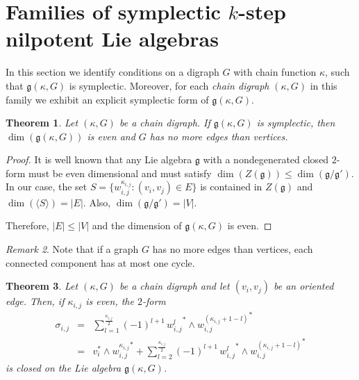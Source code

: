\documentclass[a4paper,11pt]{amsart}
\newtheorem{theorem}{Theorem}[section]
\theoremstyle{definition}
\theoremstyle{remark}
\newtheorem{remark}[theorem]{Remark}
\numberwithin{equation}{section}
\newcommand{\g}{\mathfrak{g}}
\begin{document}
\section{Families of symplectic $k$-step nilpotent Lie algebras }\label{sec:fam-sym}

In this section we identify conditions on a digraph $G$ with chain function $\kappa$, such that $\g(\kappa,G)$ is symplectic. 
Moreover, for each \emph{chain digraph} $(\kappa,G)$ in this family we exhibit an explicit symplectic form of $\g(\kappa,G)$.


\begin{theorem}
Let \((\kappa,G)\) be a chain digraph. If \(\g(\kappa,G)\) is symplectic, then \(\dim(\g(\kappa,G))\) is even and \(G\) has no more edges than vertices.
\end{theorem}

\begin{proof}
It is well known that any Lie algebra \(\g\) with a nondegenerated closed \(2\)-form must be even dimensional and must satisfy \(\dim(Z(\g))\leq \dim(\g/ \g')\). 
In our case, the set \(S=\{w_{i,j}^{\kappa_{i,j}}: (v_i,v_j)\in E\}\) is contained in \(Z(\g)\) and \(\dim(\langle S\rangle)=|E|\). Also, \(\dim(\g/ \g')=|V|\).

Therefore, \(|E|\leq |V|\) and the dimension of \(\g(\kappa,G)\) is even.
\end{proof}

\begin{remark}\label{rmk:graphs}
Note that if a graph $G$ has no more edges than vertices, each connected component has at most one cycle. 
\end{remark}


\begin{theorem}\label{thm:even}
	Let \((\kappa,G)\) be a chain digraph and let $(v_i,v_j)$ be an oriented edge.
    Then, if $\kappa_{i,j}$ is even, the \(2\)-form 
    \begin{eqnarray}
    	 \sigma_{i,j} &=& \sum_{l=1}^{\frac{\kappa_{i,j}}2} (-1)^{l+1} \,{w_{i,j}^{l}}^* \wedge {w_{i,j}^{(\kappa_{i,j}+1-l)}}^* 
                                                                                                                   \label{eqn:sigma-even}\\ 
    	                &=&  v_i^* \wedge {w_{i,j}^{\kappa_{i,j}}}^* + 
    	                 \sum_{l=2}^{\frac{\kappa_{i,j}}2} (-1)^{l+1}\,{w_{i,j}^{l}}^* \wedge {w_{i,j}^{(\kappa_{i,j}+1-l)}}^* \nonumber
    \end{eqnarray}                    
    is closed on the Lie algebra \(\g(\kappa,G)\).
\end{theorem}
\end{document}
